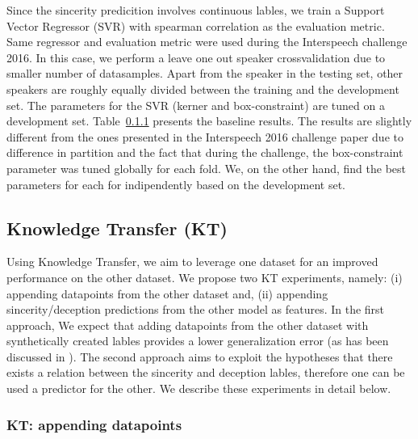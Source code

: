 \documentclass{article}
\begin{document}
Since the sincerity predicition involves continuous lables, we train a Support Vector Regressor (SVR) with spearman correlation as the evaluation metric. 
Same regressor and evaluation metric were used during the Interspeech challenge 2016.
In this case, we perform a leave one out speaker crossvalidation due to smaller number of datasamples.
Apart from the speaker in the testing set, other speakers are roughly equally divided between the training and the development set.
The parameters for the SVR (kerner and box-constraint) are tuned on a development set. 
Table~\ref{} presents the baseline results.
The results are slightly different from the ones presented in the Interspeech 2016 challenge paper \cite{} due to difference in partition and the fact that during the challenge, the box-constraint parameter was tuned globally for each fold.
We, on the other hand, find the best parameters for each for indipendently based on the development set. 

\subsection{Knowledge Transfer (KT)}
Using Knowledge Transfer, we aim to leverage one dataset for an improved performance on the other dataset.
We propose two KT experiments, namely: (i) appending datapoints from the other dataset and, (ii) appending sincerity/deception predictions from the other model as features.
In the first approach, We expect that adding datapoints from the other dataset with synthetically created lables provides a lower generalization error (as has been discussed in \cite{}). 
The second approach aims to exploit the hypotheses that there exists a relation between the sincerity and deception lables, therefore one can be used a predictor for the other.
We describe these experiments in detail below. 

\subsubsection{KT: appending datapoints}
\end{document}
